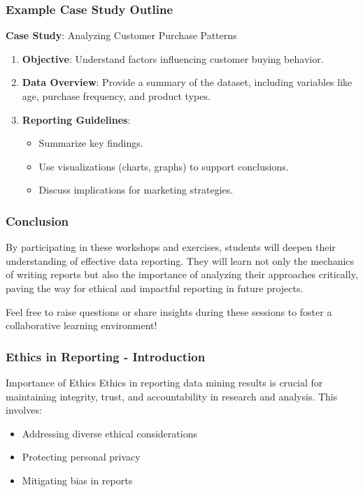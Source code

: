 \documentclass{beamer}
\begin{document}
\begin{frame}[fragile]
    \frametitle{Example Case Study Outline}
    \textbf{Case Study}: Analyzing Customer Purchase Patterns
    \begin{enumerate}
        \item \textbf{Objective}: Understand factors influencing customer buying behavior.
        \item \textbf{Data Overview}: Provide a summary of the dataset, including variables like age, purchase frequency, and product types.
        \item \textbf{Reporting Guidelines}:
            \begin{itemize}
                \item Summarize key findings.
                \item Use visualizations (charts, graphs) to support conclusions.
                \item Discuss implications for marketing strategies.
            \end{itemize}
    \end{enumerate}
\end{frame}

\begin{frame}[fragile]
    \frametitle{Conclusion}
    By participating in these workshops and exercises, students will deepen their understanding of effective data reporting. 
    They will learn not only the mechanics of writing reports but also the importance of analyzing their approaches critically, paving the way for ethical and impactful reporting in future projects.
    
    Feel free to raise questions or share insights during these sessions to foster a collaborative learning environment!
\end{frame}

\begin{frame}[fragile]
    \frametitle{Ethics in Reporting - Introduction}
    \begin{block}{Importance of Ethics}
        Ethics in reporting data mining results is crucial for maintaining integrity, trust, and accountability in research and analysis. 
        This involves:
    \end{block}
    \begin{itemize}
        \item Addressing diverse ethical considerations
        \item Protecting personal privacy
        \item Mitigating bias in reports
    \end{itemize}
\end{frame}
\end{document}
